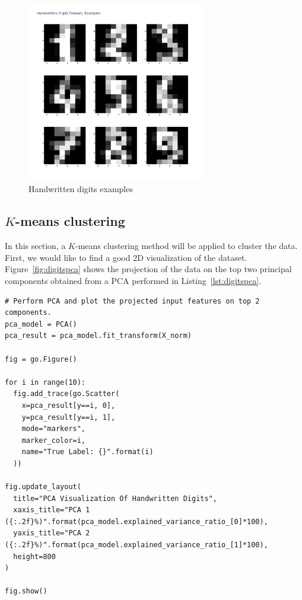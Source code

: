\documentclass[12pt]{article}
\begin{document}
  \begin{figure}[!ht]
    \centering
    \includegraphics[width=0.7\textwidth]{figures/readdigits}
    \caption{Handwritten digits examples}%
    \label{fig:readdigits}
  \end{figure} 

  \subsection{$K$-means clustering}

  In this section, a $K$-means clustering method will be applied to cluster the
  data. First, we would like to find a good 2D visualization of the dataset.
  Figure~\ref{fig:digitspca} shows the projection of the data on the top two
  principal components obtained from a PCA performed in
  Listing~\ref{lst:digitspca}.

  \begin{lstlisting}[caption={Perform PCA and project on top two components.},
    captionpos=b, label={lst:digitspca}]
# Perform PCA and plot the projected input features on top 2 components.
pca_model = PCA()
pca_result = pca_model.fit_transform(X_norm)

fig = go.Figure()

for i in range(10):
  fig.add_trace(go.Scatter(
    x=pca_result[y==i, 0],
    y=pca_result[y==i, 1],
    mode="markers",
    marker_color=i,
    name="True Label: {}".format(i)
  ))
    
fig.update_layout(
  title="PCA Visualization Of Handwritten Digits",
  xaxis_title="PCA 1 ({:.2f}%)".format(pca_model.explained_variance_ratio_[0]*100),
  yaxis_title="PCA 2 ({:.2f}%)".format(pca_model.explained_variance_ratio_[1]*100),
  height=800
)

fig.show()
  \end{lstlisting}
\end{document}

